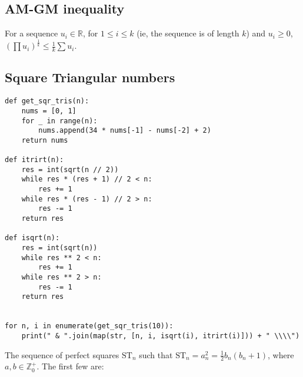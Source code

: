 \documentclass[a4paper,11pt]{article}
\newenvironment{longlisting}
{\addvspace{\baselineskip}\captionsetup{type=listing}}
{\addvspace{\baselineskip}}
\begin{document}
    \subsection{AM-GM inequality}

    For a sequence $u_i \in \mathbb{R}$, for $1 \le i \le k$ (ie, the sequence
    is of length $k$) and $u_i \ge 0$,
    \\$(\prod u_i)^\frac{1}{k} \le \frac{1}{k}\sum u_i$.

    \subsection{Square Triangular numbers}


    \begin{longlisting}
    \begin{verbatim}
def get_sqr_tris(n):
    nums = [0, 1]
    for _ in range(n):
        nums.append(34 * nums[-1] - nums[-2] + 2)
    return nums

def itrirt(n):
    res = int(sqrt(n // 2))
    while res * (res + 1) // 2 < n:
        res += 1
    while res * (res - 1) // 2 > n:
        res -= 1
    return res

def isqrt(n):
    res = int(sqrt(n))
    while res ** 2 < n:
        res += 1
    while res ** 2 > n:
        res -= 1
    return res


for n, i in enumerate(get_sqr_tris(10)):
    print(" & ".join(map(str, [n, i, isqrt(i), itrirt(i)])) + " \\\\")

    \end{verbatim}
    \end{longlisting}

    The sequence of perfect squares $\mathrm{ST}_n$ such that
    $\mathrm{ST}_n= a_n^2 = \frac 12 b_n(b_n + 1)$, where
    $a, b \in \mathbb{Z}_0^+$. The first few are:
\end{document}
